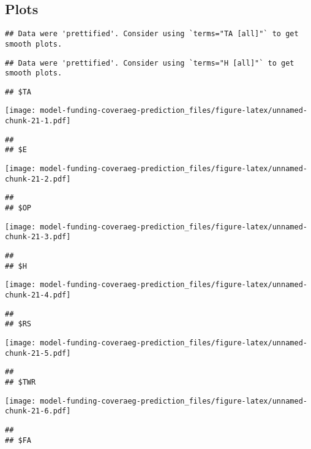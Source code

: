 \documentclass[]{article}
\begin{document}
\hypertarget{plots-3}{%
\subsection{Plots}\label{plots-3}}

\begin{verbatim}
## Data were 'prettified'. Consider using `terms="TA [all]"` to get smooth plots.
\end{verbatim}

\begin{verbatim}
## Data were 'prettified'. Consider using `terms="H [all]"` to get smooth plots.
\end{verbatim}

\begin{verbatim}
## $TA
\end{verbatim}

\texttt{[image: model-funding-coveraeg-prediction\_files/figure-latex/unnamed-chunk-21-1.pdf]}

\begin{verbatim}
## 
## $E
\end{verbatim}

\texttt{[image: model-funding-coveraeg-prediction\_files/figure-latex/unnamed-chunk-21-2.pdf]}

\begin{verbatim}
## 
## $OP
\end{verbatim}

\texttt{[image: model-funding-coveraeg-prediction\_files/figure-latex/unnamed-chunk-21-3.pdf]}

\begin{verbatim}
## 
## $H
\end{verbatim}

\texttt{[image: model-funding-coveraeg-prediction\_files/figure-latex/unnamed-chunk-21-4.pdf]}

\begin{verbatim}
## 
## $RS
\end{verbatim}

\texttt{[image: model-funding-coveraeg-prediction\_files/figure-latex/unnamed-chunk-21-5.pdf]}

\begin{verbatim}
## 
## $TWR
\end{verbatim}

\texttt{[image: model-funding-coveraeg-prediction\_files/figure-latex/unnamed-chunk-21-6.pdf]}

\begin{verbatim}
## 
## $FA
\end{verbatim}
\end{document}
